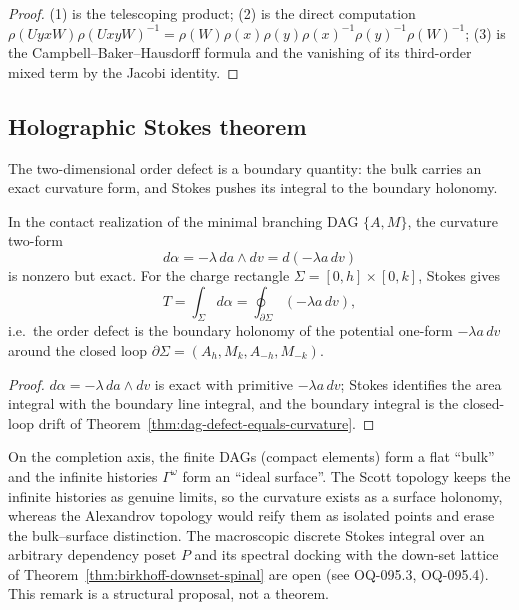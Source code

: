 \begin{proof}
(1) is the telescoping product; (2) is the direct computation
$\rho(UyxW)\rho(UxyW)^{-1}=\rho(W)\rho(x)\rho(y)\rho(x)^{-1}\rho(y)^{-1}\rho(W)^{-1}$;
(3) is the Campbell--Baker--Hausdorff formula and the vanishing of its
third-order mixed term by the Jacobi identity.
\end{proof}

\subsection{Holographic Stokes theorem}

The two-dimensional order defect is a boundary quantity: the bulk carries an
exact curvature form, and Stokes pushes its integral to the boundary holonomy.

\begin{proposition}
\label{prop:holographic-stokes-minimal}
In the contact realization of the minimal branching DAG $\{A,M\}$, the curvature
two-form
\[
  d\alpha=-\lambda\,da\wedge dv=d(-\lambda a\,dv)
\]
is nonzero but exact.  For the charge rectangle $\Sigma=[0,h]\times[0,k]$, Stokes
gives
\[
  T=\int_\Sigma d\alpha=\oint_{\partial\Sigma}(-\lambda a\,dv),
\]
i.e.\ the order defect is the boundary holonomy of the potential one-form
$-\lambda a\,dv$ around the closed loop
$\partial\Sigma=(A_h,M_k,A_{-h},M_{-k})$.
\end{proposition}

\begin{proof}
$d\alpha=-\lambda\,da\wedge dv$ is exact with primitive $-\lambda a\,dv$; Stokes
identifies the area integral with the boundary line integral, and the boundary
integral is the closed-loop drift of
Theorem~\ref{thm:dag-defect-equals-curvature}.
\end{proof}

\begin{remark}
\label{rem:scott-preserves-ideal-surface}
On the completion axis, the finite DAGs (compact elements) form a flat
``bulk'' and the infinite histories $\Gamma^\omega$ form an ``ideal surface''.
The Scott topology keeps the infinite histories as genuine limits, so the
curvature exists as a surface holonomy, whereas the Alexandrov topology would
reify them as isolated points and erase the bulk--surface distinction.  The
macroscopic discrete Stokes integral over an arbitrary dependency poset $P$ and
its spectral docking with the down-set lattice of
Theorem~\ref{thm:birkhoff-downset-spinal} are open (see OQ-095.3, OQ-095.4).
This remark is a structural proposal, not a theorem.
\end{remark}
